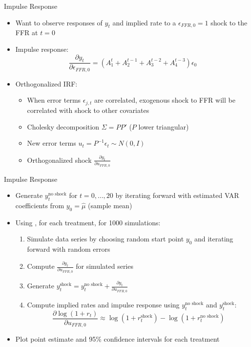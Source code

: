 \documentclass{beamer}
\begin{document}
\begin{frame}{Impulse Response}
\begin{itemize}
\item Want to observe responses of $y_t$ and implied rate to a $\epsilon_{FFR,0} = 1$ shock to the FFR at $t = 0$
\item Impulse response: $$\frac{\partial y_t}{\partial \epsilon_{FFR,0}} = (A_1^t + A_2^{t-1} + A_3^{t-2} + A_4^{t-3}) \epsilon_0$$
\item Orthogonalized IRF:
  \begin{itemize}
  \item When error terms $\epsilon_{j,t}$ are correlated, exogenous shock to FFR will be correlated with shock to other covariates
  \item Cholesky decomposition $\Sigma = PP'$ ($P$ lower triangular)
  \item New error terms $u_t = P^{-1} \epsilon_t \sim N(0, I)$
  \item Orthogonalized shock $\frac{\partial y_t}{\partial u_{FFR,0}}$
  \end{itemize}
\end{itemize}
\end{frame}

\begin{frame}{Impulse Response}
\begin{itemize}
\item Generate $y_t^\text{no shock}$ for $t = 0, \ldots, 20$ by iterating forward with estimated VAR coefficients from $y_0 = \hat{\mu}$ (sample mean)
\item Using \cite{kilian98}, for each treatment, for 1000 simulations:
  \begin{enumerate}
  \item Simulate data series by choosing random start point $y_0$ and iterating forward with random errors
  \item Compute $\frac{\partial y_t}{\partial u_{FFR,0}}$ for simulated series
  \item Generate $y_t^\text{shock} = y_t^\text{no shock} + \frac{\partial y_t}{\partial u_{FFR,0}}$
  \item Compute implied rates and impulse response using $y_t^\text{no shock}$ and $y_t^\text{shock}$: $$\frac{\partial \log(1+r_t)}{\partial u_{FFR,0}} \approx \log(1 + r_t^\text{shock}) - \log(1 + r_t^\text{no shock})$$
  \end{enumerate}
\item Plot point estimate and 95\% confidence intervals for each treatment
\end{itemize}
\end{frame}
\end{document}
